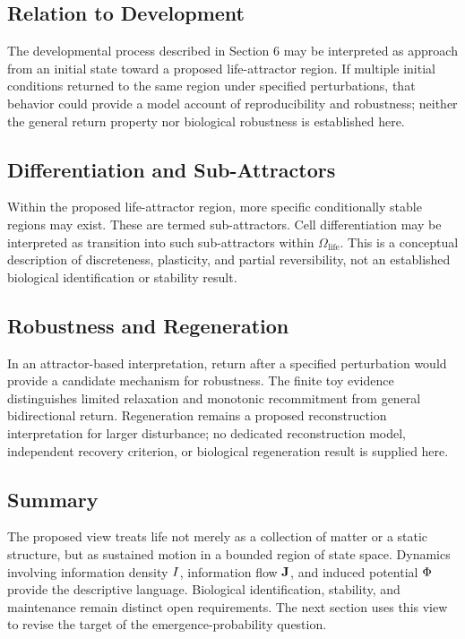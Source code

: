 \subsection{Relation to Development}

The developmental process described in Section 6 may be interpreted as approach from an initial state toward a proposed life-attractor region. If multiple initial conditions returned to the same region under specified perturbations, that behavior could provide a model account of reproducibility and robustness; neither the general return property nor biological robustness is established here.

\subsection{Differentiation and Sub-Attractors}

Within the proposed life-attractor region, more specific conditionally stable regions may exist. These are termed sub-attractors. Cell differentiation may be interpreted as transition into such sub-attractors within \(\Omega_{\mathrm{life}}\). This is a conceptual description of discreteness, plasticity, and partial reversibility, not an established biological identification or stability result.

\subsection{Robustness and Regeneration}

In an attractor-based interpretation, return after a specified perturbation would provide a candidate mechanism for robustness. The finite toy evidence distinguishes limited relaxation and monotonic recommitment from general bidirectional return. Regeneration remains a proposed reconstruction interpretation for larger disturbance; no dedicated reconstruction model, independent recovery criterion, or biological regeneration result is supplied here.

\subsection{Summary}

The proposed view treats life not merely as a collection of matter or a static structure, but as sustained motion in a bounded region of state space. Dynamics involving information density \(I\), information flow \(\mathbf{J}\), and induced potential \(\Phi\) provide the descriptive language. Biological identification, stability, and maintenance remain distinct open requirements. The next section uses this view to revise the target of the emergence-probability question.
